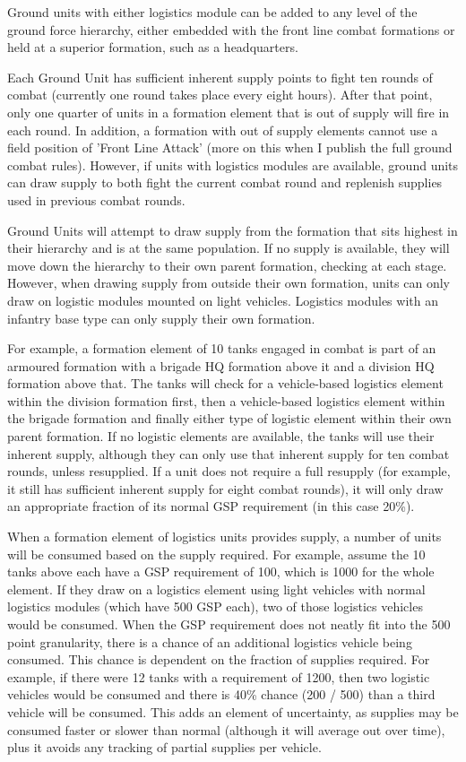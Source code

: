 \documentclass[../../Aurora C# unofficial manual.tex]{subfiles}
\begin{document}
	Ground units with either logistics module can be added to any level of the ground force hierarchy, either embedded with the front line combat formations or held at a superior formation, such as a headquarters.
	
	Each Ground Unit has sufficient inherent supply points to fight ten rounds of combat (currently one round takes place every eight hours). After that point, only one quarter of units in a formation element that is out of supply will fire in each round. In addition, a formation with out of supply elements cannot use a field position of 'Front Line Attack' (more on this when I publish the full ground combat rules). However, if units with logistics modules are available, ground units can draw supply to both fight the current combat round and replenish supplies used in previous combat rounds.
	
	Ground Units will attempt to draw supply from the formation that sits highest in their hierarchy and is at the same population. If no supply is available, they will move down the hierarchy to their own parent formation, checking at each stage. However, when drawing supply from outside their own formation, units can only draw on logistic modules mounted on light vehicles. Logistics modules with an infantry base type can only supply their own formation.
	
	For example, a formation element of 10 tanks engaged in combat is part of an armoured formation with a brigade HQ formation above it and a division HQ formation above that. The tanks will check for a vehicle-based logistics element within the division formation first, then a vehicle-based logistics element within the brigade formation and finally either type of logistic element within their own parent formation. If no logistic elements are available, the tanks will use their inherent supply, although they can only use that inherent supply for ten combat rounds, unless resupplied. If a unit does not require a full resupply (for example, it still has sufficient inherent supply for eight combat rounds), it will only draw an appropriate fraction of its normal GSP requirement (in this case 20\%).
	
	When a formation element of logistics units provides supply, a number of units will be consumed based on the supply required. For example, assume the 10 tanks above each have a GSP requirement of 100, which is 1000 for the whole element. If they draw on a logistics element using light vehicles with normal logistics modules (which have 500 GSP each), two of those logistics vehicles would be consumed. When the GSP requirement does not neatly fit into the 500 point granularity, there is a chance of an additional logistics vehicle being consumed. This chance is dependent on the fraction of supplies required. For example, if there were 12 tanks with a requirement of 1200, then two logistic vehicles would be consumed and there is 40\% chance (200 / 500) than a third vehicle will be consumed. This adds an element of uncertainty, as supplies may be consumed faster or slower than normal (although it will average out over time), plus it avoids any tracking of partial supplies per vehicle.
	
\end{document}

